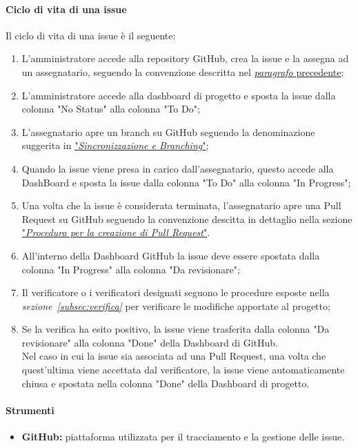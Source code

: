 \paragraph*{Ciclo di vita di una issue}
Il ciclo di vita di una issue è il seguente:
\begin{enumerate}
    \item L'amministratore accede alla repository GitHub, crea la issue e la assegna ad un assegnatario, seguendo la convenzione descritta nel \hyperlink{par:proceduraCreazioneIssue}{\textit{paragrafo} precedente};
    \item L'amministratore accede alla dashboard di progetto e sposta la issue dalla colonna "No Status" alla colonna "To Do";
    \item L'assegnatario apre un branch su GitHub seguendo la denominazione suggerita in \hyperlink{par:sincronizzazione&branching}{"\textit{Sincronizzazione e Branching}"};
    \item Quando la issue viene presa in carico dall'assegnatario, questo accede alla DashBoard e sposta la issue dalla colonna "To Do" alla colonna "In Progress";
    \item Una volta che la issue è considerata terminata, l'assegnatario apre una Pull Request su GitHub seguendo la convenzione descitta in dettaglio nella sezione \hyperlink{par:creazionePR}{"\textit{Procedura per la creazione di Pull Request}"}.
    \item All'interno della Dashboard GitHub la issue deve essere spostata dalla colonna "In Progress" alla colonna "Da revisionare";
    \item Il verificatore o i verificatori designati seguono le procedure esposte nella \textit{sezione~\ref{subsec:verifica}} per verificare le modifiche apportate al progetto;
    \item Se la verifica ha esito positivo, la issue viene trasferita dalla colonna "Da revisionare" alla colonna "Done" della Dashboard di GitHub. \\
    Nel caso in cui la issue sia associata ad una Pull Request, una volta che quest'ultima viene accettata dal verificatore, la issue viene automaticamente chiusa e spostata nella colonna "Done" della Dashboard di progetto. 
\end{enumerate}

\paragraph{Strumenti}
\begin{itemize}
  \item \textbf{GitHub:} piattaforma utilizzata per il tracciamento e la gestione delle issue.
\end{itemize}

